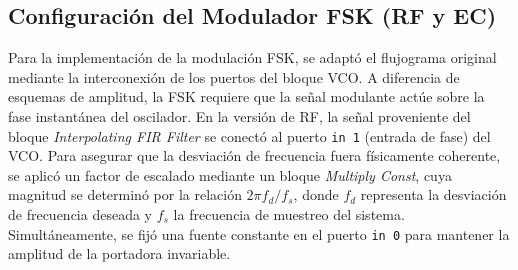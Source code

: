 \subsection{Configuración del Modulador FSK (RF y EC)}
Para la implementación de la modulación FSK, se adaptó el flujograma original mediante la interconexión de los puertos del bloque VCO. A diferencia de esquemas de amplitud, la FSK requiere que la señal modulante actúe sobre la fase instantánea del oscilador. En la versión de RF, la señal proveniente del bloque \textit{Interpolating FIR Filter} se conectó al puerto \texttt{in 1} (entrada de fase) del VCO. Para asegurar que la desviación de frecuencia fuera físicamente coherente, se aplicó un factor de escalado mediante un bloque \textit{Multiply Const}, cuya magnitud se determinó por la relación $2\pi f_d / f_s$, donde $f_d$ representa la desviación de frecuencia deseada y $f_s$ la frecuencia de muestreo del sistema. Simultáneamente, se fijó una fuente constante en el puerto \texttt{in 0} para mantener la amplitud de la portadora invariable.